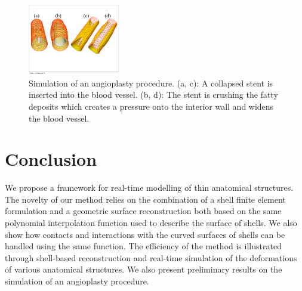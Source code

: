 \documentclass{llncs}
\begin{document}
\begin{figure}
\centering
\includegraphics[height=3.1cm]{images/stenose_final.pdf}
\caption {Simulation of an angioplasty procedure. (a, c): A collapsed stent is inserted into the blood vessel. (b, d): The stent is crushing the fatty deposits which creates a pressure onto the interior wall and widens the blood vessel.}
\label{fig-stent}
\end{figure}

\section{Conclusion}
We propose a framework for real-time modelling of thin anatomical structures. The novelty of our method relies on the combination of a shell finite element formulation and a geometric surface reconstruction both based on the same polynomial interpolation function used to describe the surface of shells. We also show how contacts and interactions with the curved surfaces of shells can be handled using the same function. The efficiency of the method is illustrated through shell-based reconstruction and real-time simulation of the deformations of various anatomical structures. We also present preliminary results on the simulation of an angioplasty procedure. 




\end{document}
